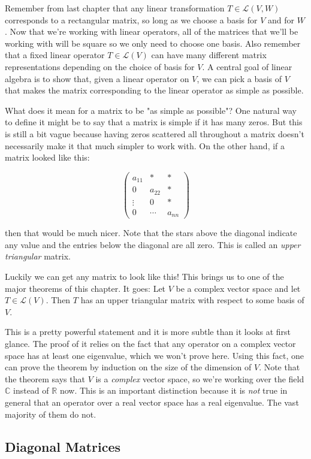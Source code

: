 \documentclass[12pt]{article}
\begin{document}
 Remember from last chapter that any linear transformation $T \in \mathcal{L} (V, W)$ corresponds to a rectangular matrix, so long as we choose a basis for $V$ and for $W$. Now that we're working with linear operators, all of the matrices that we'll be working with will be square so we only need to choose one basis. Also remember that a fixed linear operator $T \in \mathcal{L} (V)$ can have many different matrix representations depending on the choice of basis for $V$. A central goal of linear algebra is to show that, given a linear operator on $V$,  we can pick a basis of $V$ that makes the matrix corresponding to the linear operator as simple as possible.
 
 What does it mean for a matrix to be "as simple as possible"? One natural way to define it might be to say that a matrix is simple if it has many zeros. But this is still a bit vague because having zeros scattered all throughout a matrix doesn't necessarily make it that much simpler to work with. On the other hand, if a matrix looked like this:
 
 \[ 
\begin{pmatrix}
a_{11} & * & *\\
0 & a_{22} & *\\
\vdots & 0 & *\\
0 & \cdots & a_{nn} 
\end{pmatrix} \]

then that would be much nicer. Note that the stars above the diagonal indicate any value and the entries below the diagonal are all zero. This is called an \textit{upper triangular} matrix.

Luckily we can get any matrix to look like this! This brings us to one of the major theorems of this chapter. It goes: Let $V$ be a complex vector space and let $T \in \mathcal{L} (V)$. Then $T$ has an upper triangular matrix with respect to some basis of $V$.

This is a pretty powerful statement and it is more subtle than it looks at first glance. The proof of it relies on the fact that any operator on a complex vector space has at least one eigenvalue, which we won't prove here. Using this fact, one can prove the theorem by induction on the size of the dimension of $V$. Note that the theorem says that $V$ is a \textit{complex} vector space, so we're working over the field $\mathbb{C}$ instead of $\mathbb{R}$ now. This is an important distinction because it
is \textit{not} true in general that an operator over a real vector space has a real eigenvalue. The vast majority of them do not.

 
 
\subsection*{Diagonal Matrices}
\end{document}
